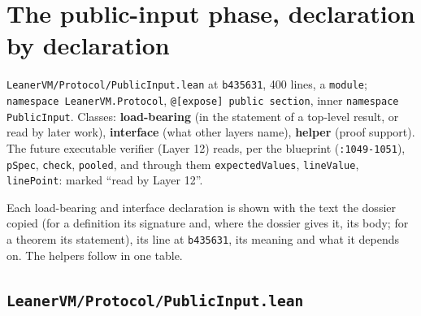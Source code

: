\section{The public-input phase, declaration by declaration}\label{sec:gen-cat-pubinput}

\texttt{L\allowbreak{}e\allowbreak{}a\allowbreak{}n\allowbreak{}e\allowbreak{}r\allowbreak{}V\allowbreak{}M\allowbreak{}/\allowbreak{}P\allowbreak{}r\allowbreak{}o\allowbreak{}t\allowbreak{}o\allowbreak{}c\allowbreak{}o\allowbreak{}l\allowbreak{}/\allowbreak{}P\allowbreak{}u\allowbreak{}b\allowbreak{}l\allowbreak{}i\allowbreak{}c\allowbreak{}I\allowbreak{}n\allowbreak{}p\allowbreak{}u\allowbreak{}t\allowbreak{}.\allowbreak{}l\allowbreak{}e\allowbreak{}a\allowbreak{}n} at \texttt{b435631}, 400 lines, a \texttt{module}; \texttt{namespace LeanerVM.\allowbreak{}Protocol}, \texttt{@[expose] public section}, inner \texttt{namespace PublicInput}. Classes: \textbf{load-bearing} (in the statement of a top-level result, or read by later work), \textbf{interface} (what other layers name), \textbf{helper} (proof support). The future executable verifier (Layer 12) reads, per the blueprint (\texttt{:1049-{}1051}), \texttt{pSpec}, \texttt{check}, \texttt{pooled}, and through them \texttt{expectedValues}, \texttt{lineValue}, \texttt{linePoint}: marked \enquote{read by Layer 12}.

\par{}\par

Each load-bearing and interface declaration is shown with the text the dossier copied (for a definition its signature and, where the dossier gives it, its body; for a theorem its statement), its line at \texttt{b435631}, its meaning and what it depends on. The helpers follow in one table.

\subsection{\texttt{LeanerVM/Protocol/PublicInput.lean}}

